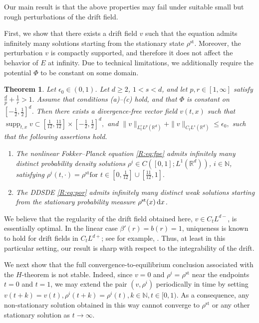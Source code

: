 \documentclass[UTF-8,reqno]{amsart}
\numberwithin{equation}{section}
\newtheorem{theorem}{Theorem}[section]
\theoremstyle{definition}
\def\dif{{\mathord{{\rm d}}}}
\def\geq{\geqslant}
\def\leq{\leqslant}
\def\dif{{\mathord{{\rm d}}}}
\def\bt{\begin{theorem}}
\def\et{\end{theorem}}
\def\geq{\geqslant}
\def\leq{\leqslant}
\begin{document}
Our main result is that the above properties may fail under suitable small but
rough perturbations of the drift field.

First, we show that there exists a drift field $v$ such that the equation
admits infinitely many solutions starting from the stationary state
$\rho^{\mathrm{st}}$. Moreover, the perturbation $v$ is compactly supported, and
therefore it does not affect the behavior of $E$ at infinity. Due to technical
limitations, we additionally require the potential $\Phi$ to be constant on some domain.

\bt\label{R:thm:4converge}
Let $\epsilon_0\in(0,1)$. Let $d\geq 2$, $1<s<d$, and let
$p,r\in[1,\infty]$ satisfy
$
\frac{d}{p}+\frac{1}{r}>1 .
$
Assume that conditions \textnormal{(a)}--\textnormal{(c)} hold, and that
$\Phi$ is constant on $[-\frac12,\frac12]^d$. Then there exists a
divergence-free vector field $v(t,x)$ such that
$
\operatorname{supp}_{t,x}v
\subset
 [\frac1{12},\frac{11}{12} ]
\times
 [-\frac12,\frac12 ]^d,
$
and $\|v\|_{L^r_tL^p(\mathbb{R}^d)}
+
\|v\|_{C_tL^s(\mathbb{R}^d)}
\leq
\epsilon_0 ,$ 
such that the following assertions hold.

\begin{enumerate}
    \item
    The nonlinear Fokker--Planck equation \eqref{R:eq:fpe} admits infinitely
    many distinct probability density solutions
    $\rho^i\in C([0,1];L^1(\mathbb{R}^d))$, $i\in\mathbb{N}$, satisfying
 $
    \rho^i(t,\cdot)=\rho^{\mathrm{st}}
    \text{for }
    t\in
     [0,\frac1{12} ]
    \cup
     [\frac{11}{12},1].
   $

    \item
    The DDSDE \eqref{R:eq:por} admits infinitely many distinct weak
    solutions starting from the stationary probability measure
    $\rho^{\mathrm{st}}(x)\,\dif x$.
\end{enumerate}
\et

We believe that the regularity of the drift field obtained here,
$v\in C_tL^{d-}$, is essentially optimal. In the linear case
$\beta'(r)=b(r)=1$, uniqueness is known to hold for drift fields in
$C_tL^{d+}$; see for example, \cite{KR05,Zha11,RZ21}. Thus, at least in this particular setting, our
result is sharp with respect to the integrability of the drift. 

We next show that the full convergence-to-equilibrium conclusion associated
with the $H$-theorem is not stable. 
Indeed, since
$
  v=0 
$
and $\rho^i=\rho^{\mathrm{st}}$ near the endpoints $t=0$ and $t=1$, we
may extend the pair $(v,\rho^i)$ periodically in time by setting
$
v(t+k)=v(t),
\rho^i(t+k)=\rho^i(t),
k\in\mathbb{N},
t\in[0,1).
$
As a consequence, any non-stationary solution obtained in this way cannot
converge to $\rho^{\mathrm{st}}$ or any other stationary solution as $t\to\infty$.
\end{document}
